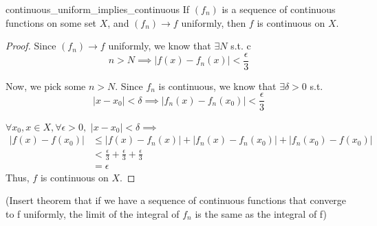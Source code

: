 \begin{thm}{}{continuous_uniform_implies_continuous}
If \((f_n)\) is a sequence of continuous functions on some set \(X\), and \((f_n) \to f\) uniformly, then \(f\) is continuous on \(X\).
\newline
\begin{proof}
Since \((f_n)\to f\) uniformly, we know that \(\exists N\) s.t. 
c\begin{equation*}
n > N \implies |f(x) - f_n(x)| < \frac{\epsilon}{3}
\end{equation*}

Now, we pick some \(n>N\). Since \(f_n\) is continuous, we know that \(\exists \delta > 0\) s.t. 
\begin{equation*}
|x - x_0| < \delta \implies |f_n(x) - f_n(x_0)| < \frac{\epsilon}{3}
\end{equation*}

\(\forall x_0,x \in X, \forall \epsilon > 0,\)
\newline
\(|x - x_0| < \delta \implies\) 
\begin{align*}
|f(x) - f(x_0)| &\leq |f(x) - f_n(x)| + |f_n(x) - f_n(x_0)| + |f_n(x_0) - f(x_0)| \\
		   &< \frac{\epsilon}{3} + \frac{\epsilon}{3} + \frac{\epsilon}{3} \\
		   &= \epsilon
\end{align*}
Thus, \(f\) is continuous on \(X\).




\end{proof}
\end{thm}
(Insert theorem that if we have a sequence of continuous functions that converge to f uniformly, the limit of the integral of \(f_n\) is the same as the integral of f)